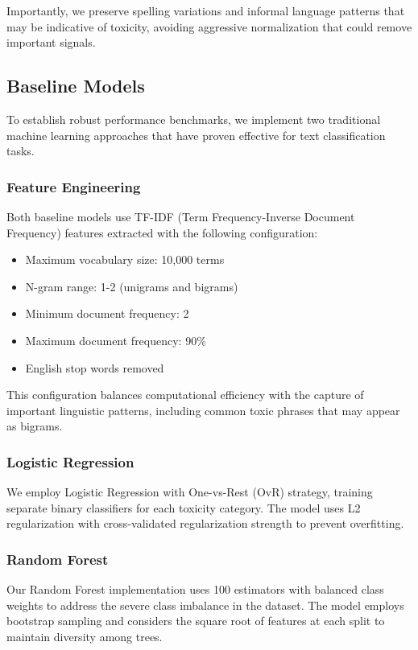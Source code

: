 \documentclass[11pt]{article}
\begin{document}
Importantly, we preserve spelling variations and informal language patterns that may be indicative of toxicity, avoiding aggressive normalization that could remove important signals.

\subsection{Baseline Models}

To establish robust performance benchmarks, we implement two traditional machine learning approaches that have proven effective for text classification tasks.

\subsubsection{Feature Engineering}

Both baseline models use TF-IDF (Term Frequency-Inverse Document Frequency) features extracted with the following configuration:
\begin{itemize}
    \item Maximum vocabulary size: 10,000 terms
    \item N-gram range: 1-2 (unigrams and bigrams)
    \item Minimum document frequency: 2
    \item Maximum document frequency: 90\%
    \item English stop words removed
\end{itemize}

This configuration balances computational efficiency with the capture of important linguistic patterns, including common toxic phrases that may appear as bigrams.

\subsubsection{Logistic Regression}

We employ Logistic Regression with One-vs-Rest (OvR) strategy, training separate binary classifiers for each toxicity category. The model uses L2 regularization with cross-validated regularization strength to prevent overfitting.

\subsubsection{Random Forest}

Our Random Forest implementation uses 100 estimators with balanced class weights to address the severe class imbalance in the dataset. The model employs bootstrap sampling and considers the square root of features at each split to maintain diversity among trees.
\end{document}
